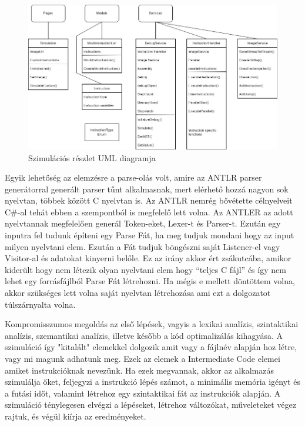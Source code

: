 \begin{figure}[h]
\centering
\includegraphics[scale=0.4]{images/SimUML.jpg}
\caption{Szimulációs részlet UML diagramja}
\label{fig:simUML}
\end{figure}

Egyik lehetőség az elemzésre a parse-olás volt, amire az ANTLR parser generátorral generált parser tűnt alkalmasnak, mert elérhető hozzá nagyon sok nyelvtan, többek között C nyelvtan is. Az ANTLR nemrég bővétette célnyelveit C{\#}-al tehát ebben a szempontból is megfelelő lett volna. Az ANTLER az adott nyelvtannak megfelelően generál Token-eket, Lexer-t és Parser-t. Ezután egy inputra fel tudunk építeni egy Parse Fát, ha meg tudjuk mondani hogy az input milyen nyelvtani elem. Ezután a Fát tudjuk böngészni saját Listener-el vagy Visitor-al és adatokat kinyerni belőle. Ez az irány akkor ért zsákutcába, amikor kiderült hogy nem létezik olyan nyelvtani elem hogy “teljes C fájl” és így nem lehet egy forrásfájlból Parse Fát létrehozni. Ha mégis e mellett döntöttem volna, akkor szükséges lett volna saját nyelvtan létrehozása ami ezt a dolgozatot túlszárnyalta volna.

Kompromisszumos megoldás az első lépések, vagyis a lexikai analízis, szintaktikai analízis, szemantikai analízis, illetve később a kód optimalizálás kihagyása. A szimuláció így "kitalált" elemekkel dolgozik amit vagy a fájlnév alapján hoz létre, vagy mi magunk adhatunk meg. Ezek az elemek a Intermediate Code elemei amiket instrukcióknak nevezünk. Ha ezek megvannak, akkor az alkalmazás szimulálja őket, feljegyzi a instrukció lépés számot, a minimális memória igényt és a futási időt, valamint létrehoz egy szintaktikai fát az instrukciók alapján. A szimuláció ténylegesen elvégzi a lépéseket, létrehoz változókat, műveleteket végez rajtuk, és végül kiírja az eredményeket.



